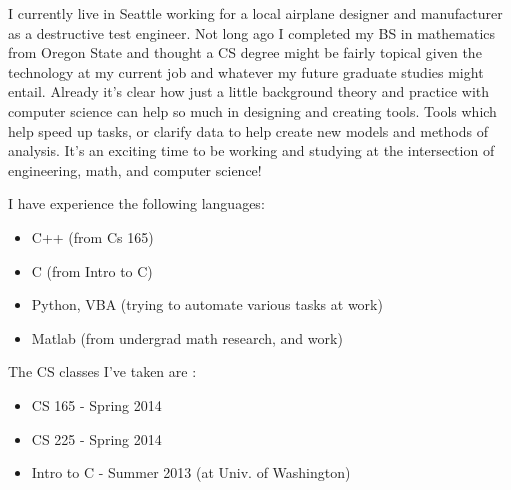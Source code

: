 \documentclass[letterpaper,12pt]{article}
\begin{document}
I currently live in Seattle working for a local airplane designer and manufacturer as a destructive test engineer.  Not long ago I completed my BS in mathematics from Oregon State and thought a CS degree might be fairly topical given the technology at my current job and whatever my future graduate studies might entail.  
Already it's clear how just a little background theory and practice with computer science can help so much in designing and creating tools.  Tools which help speed up tasks, or clarify data to help create new models and methods of analysis.  
It's an exciting time to be working and studying at the intersection of engineering, math, and computer science!

I have experience the following languages:

\begin{itemize}
    \item C++ (from Cs 165)
    \item C (from Intro to C)
    \item Python, VBA (trying to automate various tasks at work)
    \item Matlab (from undergrad math research, and work)
\end{itemize} 

The CS classes I've taken are :

\begin{itemize}
    \item CS 165 - Spring 2014
    \item CS 225 - Spring 2014
    \item Intro to C - Summer 2013 (at Univ. of Washington)
\end{itemize}
\end{document}

